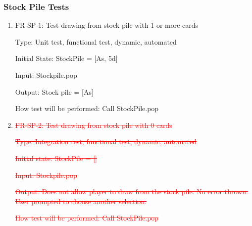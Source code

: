 \documentclass[12pt, titlepage]{article}
\begin{document}
\subsubsection{Stock Pile Tests}
\begin{enumerate}
    \item{FR-SP-1: Test drawing from stock pile with 1 or more cards}
    
    Type: Unit test, functional test, dynamic, automated 
    					
    Initial State: StockPile = [As, 5d]
    
    Input: Stockpile.pop
    
    Output: Stock pile = [As]
    
    How test will be performed: Call StockPile.pop
    
    \item{\textcolor{red}{\sout{FR-SP-2: Test drawing from stock pile with 0 cards}}}
    
    \textcolor{red}{\sout{Type: Integration test, functional test, dynamic, automated}}
    
    \textcolor{red}{\sout{Initial state: StockPile = []}}
    
    \textcolor{red}{\sout{Input: Stockpile.pop}}
    
    \textcolor{red}{\sout{Output: Does not allow player to draw from the stock pile. No error thrown. User prompted to choose another selection.}}
    					
    \textcolor{red}{\sout{How test will be performed: Call StockPile.pop}}
\end{enumerate}
\end{document}
